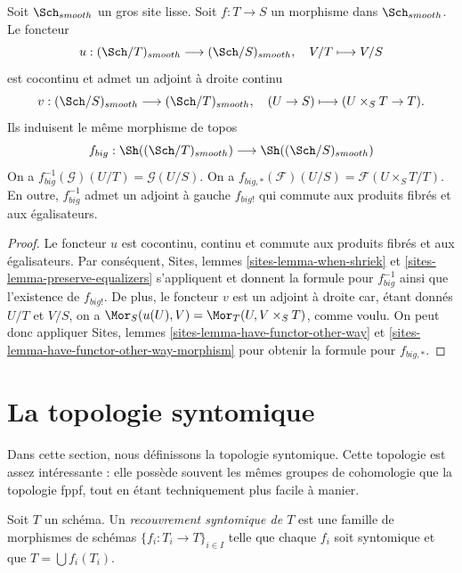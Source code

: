 \begin{lemma}
\label{lemma-morphism-big-smooth}
Soit $\Sch_{smooth}$ un gros site lisse.
Soit $f : T \to S$ un morphisme dans $\Sch_{smooth}$.
Le foncteur
$$
u : (\Sch/T)_{smooth} \longrightarrow (\Sch/S)_{smooth},
\quad
V/T \longmapsto V/S
$$
est cocontinu et admet un adjoint à droite continu
$$
v : (\Sch/S)_{smooth} \longrightarrow (\Sch/T)_{smooth},
\quad
(U \to S) \longmapsto (U \times_S T \to T).
$$
Ils induisent le même morphisme de topos
$$
f_{big} :
\Sh((\Sch/T)_{smooth})
\longrightarrow
\Sh((\Sch/S)_{smooth})
$$
On a $f_{big}^{-1}(\mathcal{G})(U/T) = \mathcal{G}(U/S)$.
On a $f_{big, *}(\mathcal{F})(U/S) = \mathcal{F}(U \times_S T/T)$.
En outre, $f_{big}^{-1}$ admet un adjoint à gauche $f_{big!}$ qui commute aux
produits fibrés et aux égalisateurs.
\end{lemma}

\begin{proof}
Le foncteur $u$ est cocontinu, continu et commute aux produits fibrés
et aux égalisateurs. Par conséquent,
Sites, lemmes \ref{sites-lemma-when-shriek} et
\ref{sites-lemma-preserve-equalizers}
s'appliquent et donnent la formule
pour $f_{big}^{-1}$ ainsi que l'existence de $f_{big!}$. De plus,
le foncteur $v$ est un adjoint à droite car, étant donnés $U/T$ et $V/S$,
on a $\Mor_S(u(U), V) = \Mor_T(U, V \times_S T)$,
comme voulu. On peut donc appliquer
Sites, lemmes \ref{sites-lemma-have-functor-other-way} et
\ref{sites-lemma-have-functor-other-way-morphism} pour obtenir la
formule pour $f_{big, *}$.
\end{proof}











\section{La topologie syntomique}
\label{section-syntomic}

\noindent
Dans cette section, nous définissons la topologie syntomique.
Cette topologie est assez intéressante : elle possède souvent
les mêmes groupes de cohomologie que la topologie fppf,
tout en étant techniquement plus facile à manier.

\begin{definition}
\label{definition-syntomic-covering}
Soit $T$ un schéma. Un {\it recouvrement syntomique de $T$} est une famille
de morphismes de schémas $\{f_i : T_i \to T\}_{i \in I}$
telle que chaque $f_i$ soit syntomique et
que $T = \bigcup f_i(T_i)$.
\end{definition}

